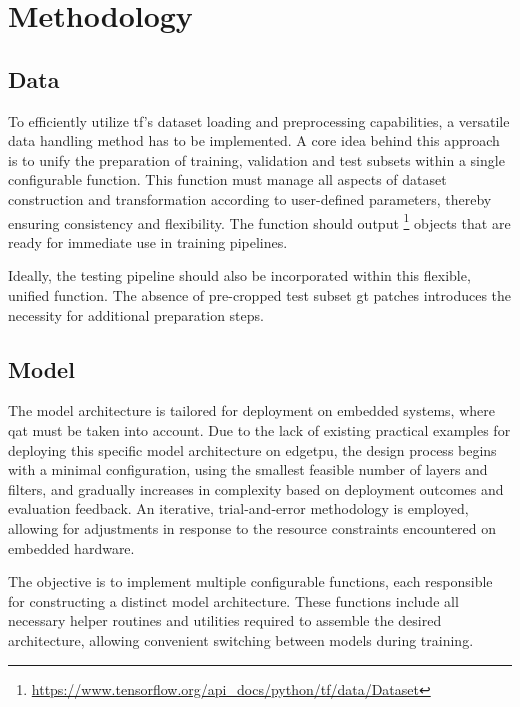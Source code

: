{\section{Methodology}

\subsection*{Data}

To efficiently utilize \gls{tf}'s dataset loading and preprocessing capabilities, a versatile data handling method has to be implemented.
A core idea behind this approach is to unify the preparation of training, validation and test subsets within a single configurable function.
This function must manage all aspects of dataset construction and transformation according to user-defined parameters, thereby ensuring consistency and flexibility.
The function should output \footnote{\url{https://www.tensorflow.org/api_docs/python/tf/data/Dataset}} objects that are ready for immediate use in training pipelines.

Ideally, the testing pipeline should also be incorporated within this flexible, unified function.
The absence of pre-cropped test subset \gls{gt} patches introduces the necessity for additional preparation steps.

\subsection*{Model}

The model architecture is tailored for deployment on embedded systems, where \gls{qat} must be taken into account.
Due to the lack of existing practical examples for deploying this specific model architecture on \gls{edgetpu},
the design process begins with a minimal configuration, using the smallest feasible number of layers and filters,
and gradually increases in complexity based on deployment outcomes and evaluation feedback.
An iterative, trial-and-error methodology is employed, allowing for adjustments in response to the resource constraints encountered on embedded hardware.

The objective is to implement multiple configurable functions, each responsible for constructing a distinct model architecture.
These functions include all necessary helper routines and utilities required to assemble the desired architecture,
allowing convenient switching between models during training.

}
